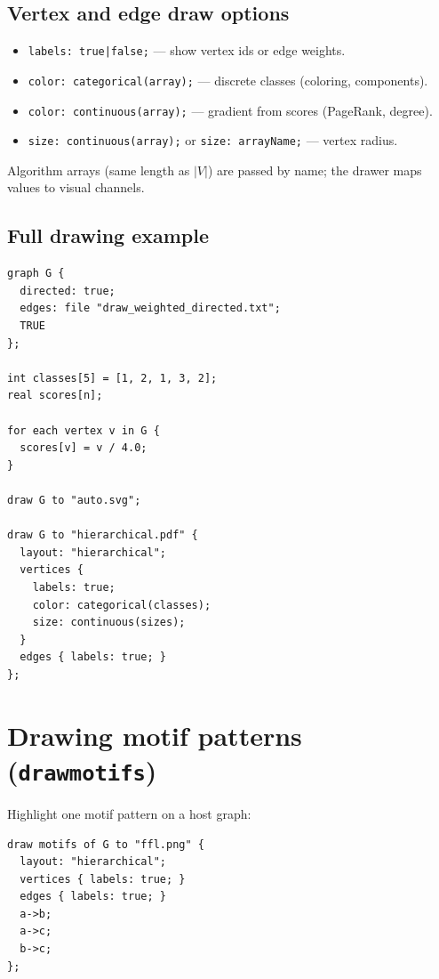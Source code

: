 \documentclass[11pt,a4paper]{article}
\newcommand{\kw}[1]{\texttt{\textcolor{codekw}{#1}}}
\begin{document}
\subsection{Vertex and edge draw options}

\begin{itemize}[nosep]
  \item \kw{labels: true|false;} --- show vertex ids or edge weights.
  \item \kw{color: categorical(array);} --- discrete classes (coloring, components).
  \item \kw{color: continuous(array);} --- gradient from scores (PageRank, degree).
  \item \kw{size: continuous(array);} or \kw{size: arrayName;} --- vertex radius.
\end{itemize}

Algorithm arrays (same length as $|V|$) are passed by name; the drawer maps
values to visual channels.

\subsection{Full drawing example}

\begin{lstlisting}
graph G {
  directed: true;
  edges: file "draw_weighted_directed.txt";
  TRUE
};

int classes[5] = [1, 2, 1, 3, 2];
real scores[n];

for each vertex v in G {
  scores[v] = v / 4.0;
}

draw G to "auto.svg";

draw G to "hierarchical.pdf" {
  layout: "hierarchical";
  vertices {
    labels: true;
    color: categorical(classes);
    size: continuous(sizes);
  }
  edges { labels: true; }
};
\end{lstlisting}

\section{Drawing motif patterns (\texttt{drawmotifs})}

Highlight one motif pattern on a host graph:

\begin{lstlisting}
draw motifs of G to "ffl.png" {
  layout: "hierarchical";
  vertices { labels: true; }
  edges { labels: true; }
  a->b;
  a->c;
  b->c;
};
\end{lstlisting}
\end{document}
